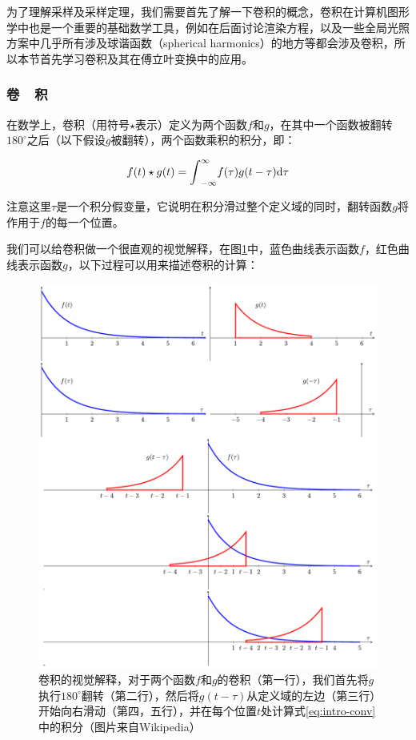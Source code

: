 为了理解采样及采样定理，我们需要首先了解一下卷积的概念，卷积在计算机图形学中也是一个重要的基础数学工具，例如在后面讨论渲染方程，以及一些全局光照方案中几乎所有涉及球谐函数（spherical harmonics）的地方等都会涉及卷积，所以本节首先学习卷积及其在傅立叶变换中的应用。




\subsubsection{卷~~积}
在数学上，卷积（用符号$\star$表示）定义为两个函数$f$和$g$，在其中一个函数被翻转$180^{\circ}$之后（以下假设$g$被翻转），两个函数乘积的积分，即：

\begin{equation}\label{eq:intro-conv}
	f(t)\star g(t)={\rm \int}^{\infty}_{-\infty}f(\tau)g(t-\tau){\rm d}\tau
\end{equation}

\noindent 注意这里$\tau$是一个积分假变量，它说明在积分滑过整个定义域的同时，翻转函数$g$将作用于$f$的每一个位置。

我们可以给卷积做一个很直观的视觉解释，在图\ref{f:intro-Convolution}中，蓝色曲线表示函数$f$，红色曲线表示函数$g$，以下过程可以用来描述卷积的计算：

\begin{figure}
	\includegraphics[width=\textwidth]{figures/intro/Convolution}
	\caption{卷积的视觉解释，对于两个函数$f$和$g$的卷积（第一行），我们首先将$g$执行$180^{\circ}$翻转（第二行），然后将$g(t-\tau)$从定义域的左边（第三行）开始向右滑动（第四，五行），并在每个位置$t$处计算式\ref{eq:intro-conv}中的积分（图片来自Wikipedia）}
	\label{f:intro-Convolution}
\end{figure}

